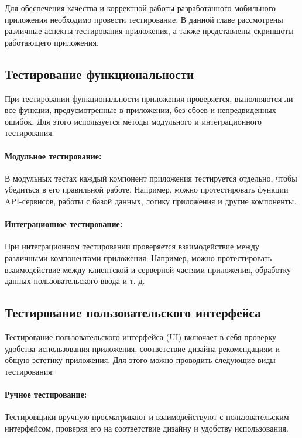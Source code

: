 Для обеспечения качества и корректной работы разработанного мобильного приложения необходимо провести тестирование. В данной главе рассмотрены различные аспекты тестирования приложения, а также представлены скриншоты работающего приложения.

\subsection{Тестирование функциональности}

При тестировании функциональности приложения проверяется, выполняются ли все функции, предусмотренные в приложении, без сбоев и непредвиденных ошибок. Для этого используется методы модульного и интеграционного тестирования.

\paragraph{Модульное тестирование:} В модульных тестах каждый компонент приложения тестируется отдельно, чтобы убедиться в его правильной работе. Например, можно протестировать функции API-сервисов, работы с базой данных, логику приложения и другие компоненты.

\paragraph{Интеграционное тестирование:} При интеграционном тестировании проверяется взаимодействие между различными компонентами приложения. Например, можно протестировать взаимодействие между клиентской и серверной частями приложения, обработку данных пользовательского ввода и т. д.

\subsection{Тестирование пользовательского интерфейса}

Тестирование пользовательского интерфейса (UI) включает в себя
проверку удобства использования приложения,
соответствие дизайна рекомендациям и общую эстетику приложения.
Для этого можно проводить следующие виды тестирования:

\paragraph{Ручное тестирование:} Тестировщики вручную просматривают
и взаимодействуют с пользовательским интерфейсом,
проверяя его на соответствие дизайну и удобству использования.

